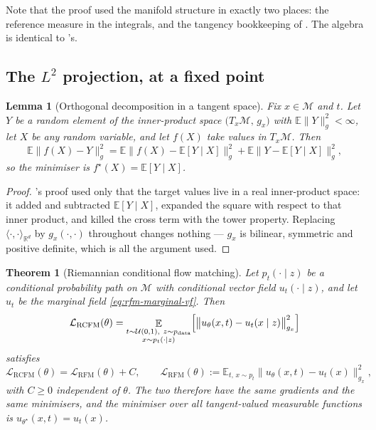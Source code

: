 \documentclass[11pt,a4paper]{report}
\newtheorem{theorem}{Theorem}[chapter]
\newtheorem{lemma}[lemma]{Lemma}
\theoremstyle{definition}
\theoremstyle{remark}
\newcommand{\RR}{\mathbb R}
\newcommand{\EE}{\mathbb E}
\begin{document}
Note that the proof used the manifold structure in exactly two places: the
reference measure in the integrals, and the tangency bookkeeping of
. The algebra is identical to
's.

\subsection{The $L^2$ projection, at a fixed point}

\begin{lemma}[Orthogonal decomposition in a tangent space]
\label{lem:rfm-l2-projection}
Fix $x\in\mathcal M$ and $t$. Let $Y$ be a random element of the
inner-product space $\bigl(T_x\mathcal M,\,g_x\bigr)$ with
$\EE\|Y\|_{g}^2<\infty$, let $X$ be any random variable, and let $f(X)$ take
values in $T_x\mathcal M$. Then
\[
\EE\bigl\|f(X)-Y\bigr\|_{g}^2
=
\EE\bigl\|f(X)-\EE[Y\mid X]\bigr\|_{g}^2
+
\EE\bigl\|Y-\EE[Y\mid X]\bigr\|_{g}^2 ,
\]
so the minimiser is $f^\star(X)=\EE[Y\mid X]$.
\end{lemma}

\begin{proof}
's proof used only that the target values live in a
real inner-product space: it added and subtracted $\EE[Y\mid X]$, expanded
the square with respect to that inner product, and killed the cross term
with the tower property. Replacing $\langle\cdot,\cdot\rangle_{\RR^d}$ by
$g_x(\cdot,\cdot)$ throughout changes nothing --- $g_x$ is bilinear,
symmetric and positive definite, which is all the argument used.
\end{proof}

\begin{theorem}[Riemannian conditional flow matching]
\label{thm:rcfm-general}
Let $p_t(\cdot\mid z)$ be a conditional probability path on $\mathcal M$
with conditional vector field $u_t(\cdot\mid z)$, and let $u_t$ be the
marginal field \eqref{eq:rfm-marginal-vf}. Then
\begin{equation}
\label{eq:rcfm-loss}
\mathcal L_{\mathrm{RCFM}}(\theta)
=
\mathop{\EE}_{\substack{t\sim\mathcal U(0,1),\ z\sim p_{\mathrm{data}}\\ x\sim p_t(\cdot\mid z)}}
\Bigl[\bigl\|u_\theta(x,t)-u_t(x\mid z)\bigr\|_{g_x}^2\Bigr]
\end{equation}
satisfies
\[
\mathcal L_{\mathrm{RCFM}}(\theta)=\mathcal L_{\mathrm{RFM}}(\theta)+C ,
\qquad
\mathcal L_{\mathrm{RFM}}(\theta):=\EE_{t,\,x\sim p_t}\bigl\|u_\theta(x,t)-u_t(x)\bigr\|_{g_x}^2 ,
\]
with $C\ge0$ independent of $\theta$.
The two therefore have the same gradients and the same minimisers, and the
minimiser over all tangent-valued measurable functions is
$u_{\theta^\star}(x,t)=u_t(x)$.
\end{theorem}
\end{document}
